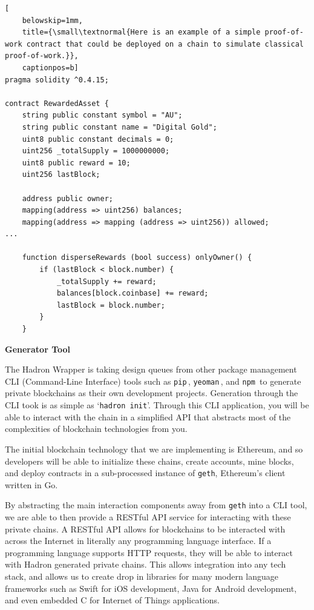 \documentclass{%
	article}
\begin{document}
\begin{lstlisting}[
	belowskip=1mm,
	title={\small\textnormal{Here is an example of a simple proof-of-work contract that could be deployed on a chain to simulate classical proof-of-work.}},
	captionpos=b]
pragma solidity ^0.4.15;

contract RewardedAsset {
    string public constant symbol = "AU";
    string public constant name = "Digital Gold";
    uint8 public constant decimals = 0;
    uint256 _totalSupply = 1000000000;
    uint8 public reward = 10;
    uint256 lastBlock;

    address public owner;
    mapping(address => uint256) balances;
    mapping(address => mapping (address => uint256)) allowed;
...

    function disperseRewards (bool success) onlyOwner() {
        if (lastBlock < block.number) {
            _totalSupply += reward;
            balances[block.coinbase] += reward;
            lastBlock = block.number;
        }
    }

\end{lstlisting}

\begin{center}
\textbf{Generator Tool}
\end{center}

The Hadron Wrapper is taking design queues from other package management CLI (Command-Line Interface) tools such as \texttt{pip}\,\cite{pip}, \texttt{yeoman}\,\cite{yeoman}, and \texttt{npm}\,\cite{npm} to generate private blockchains as their own development projects. Generation through the CLI took is as simple as ‘\texttt{hadron init}’. Through this CLI application, you will be able to interact with the chain in a simplified API that abstracts most of the complexities of blockchain technologies from you.

The initial blockchain technology that we are implementing is Ethereum, and so developers will be able to initialize these chains, create accounts, mine blocks, and deploy contracts in a sub-processed instance of \texttt{geth}, Ethereum’s client written in Go.

By abstracting the main interaction components away from \texttt{geth} into a CLI tool, we are able to then provide a RESTful API service for interacting with these private chains. A RESTful API allows for blockchains to be interacted with across the Internet in literally any programming language interface. If a programming language supports HTTP requests, they will be able to interact with Hadron generated private chains. This allows integration into any tech stack, and allows us to create drop in libraries for many modern language frameworks such as Swift for iOS development, Java for Android development, and even embedded C for Internet of Things applications.
\end{document}
